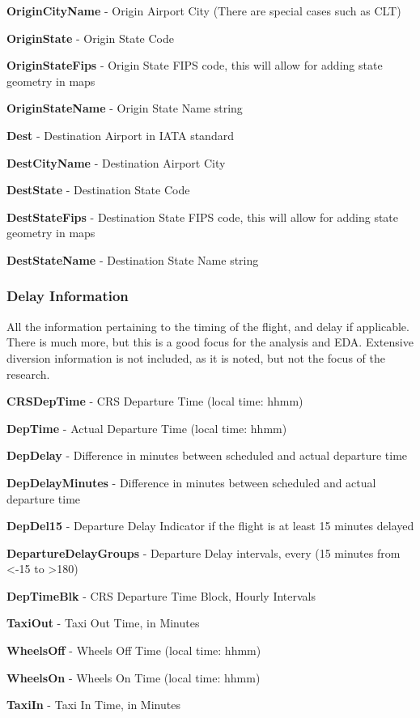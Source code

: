 \documentclass[a4paper,11pt]{article}
\begin{document}
\textbf{OriginCityName} - Origin Airport City (There are special cases such as CLT)

\textbf{OriginState} - Origin State Code

\textbf{OriginStateFips} - Origin State FIPS code, this will allow for adding state geometry in maps

\textbf{OriginStateName} - Origin State Name string

\textbf{Dest} - Destination Airport in IATA standard

\textbf{DestCityName} - Destination Airport City

\textbf{DestState} - Destination State Code

\textbf{DestStateFips} - Destination State FIPS code, this will allow for adding state geometry in maps

\textbf{DestStateName} - Destination State Name string

\subsubsection{Delay Information}
All the information pertaining to the timing of the flight, and delay if applicable. There is much more, but this is a good focus for the analysis and EDA.
Extensive diversion information is not included, as it is noted, but not the focus of the research.

\textbf{CRSDepTime} - CRS Departure Time (local time: hhmm)

\textbf{DepTime} - Actual Departure Time (local time: hhmm)

\textbf{DepDelay} - Difference in minutes between scheduled and actual departure time

\textbf{DepDelayMinutes} - Difference in minutes between scheduled and actual departure time

\textbf{DepDel15} - Departure Delay Indicator if the flight is at least 15 minutes delayed

\textbf{DepartureDelayGroups} - Departure Delay intervals, every (15 minutes from <-15 to >180)

\textbf{DepTimeBlk} - CRS Departure Time Block, Hourly Intervals

\textbf{TaxiOut} - Taxi Out Time, in Minutes

\textbf{WheelsOff} - Wheels Off Time (local time: hhmm)

\textbf{WheelsOn} - Wheels On Time (local time: hhmm)

\textbf{TaxiIn} - Taxi In Time, in Minutes
\end{document}
